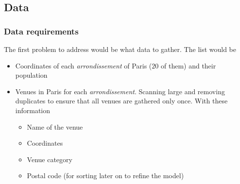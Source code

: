\documentclass[english]{article}
\begin{document}
	\subsection{Data}
	\subsubsection{Data requirements}
	The first problem to address would be what data to gather. The list would be
	\begin{itemize}
		\item Coordinates of each \textit{arrondissement} of Paris ($20$ of them) and their population
		\item Venues in Paris for each \textit{arrondissement}. Scanning large and removing duplicates to ensure that all venues are gathered only once. With these information
		\begin{itemize}
			\item Name of the venue
			\item Coordinates
			\item Venue category
			\item Postal code (for sorting later on to refine the model)
		\end{itemize}
	\end{itemize}
\end{document}
